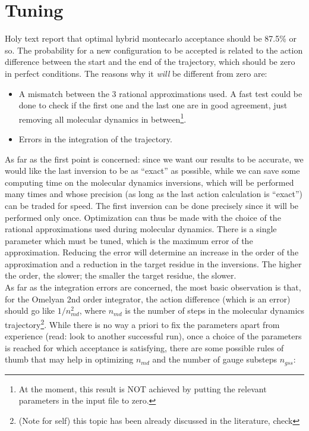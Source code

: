 \documentclass[a4paper,10pt]{book}
\begin{document}
\section{Tuning}
Holy text report that optimal hybrid montecarlo acceptance should be 87.5\% or so. 
The probability for a new configuration to be accepted is related to the action 
difference between the start and the end of the trajectory, which should be zero in 
perfect conditions. The reasons why it \emph{will} be different from zero are:
\begin{itemize}
 \item A mismatch between the 3 rational approximations used. A fast test could be done 
to check if the first one and the last one are in good agreement, just removing all 
molecular dynamics in between\footnote{At the moment, this result is NOT achieved by 
putting the relevant parameters in the input file to zero.}. 
 \item Errors in the integration of the trajectory.
\end{itemize}
As far as the first point is concerned: since we want our results to be accurate, we 
would like the last inversion to be as 
``exact'' as possible, while we can save some computing time on the molecular dynamics 
inversions, which will be performed many times and whose precision (as long as the last 
action calculation is ``exact'') can be traded for speed. The first inversion can be 
done precisely since it will be performed only once. Optimization can thus be made with
the choice of the rational approximations used during molecular dynamics. There is a 
single parameter which must be tuned, which is the maximum error of the approximation. 
Reducing the error will determine an increase in the order of the approximation and a 
reduction in the target residue in the inversions. The higher the order, the slower; 
the smaller the target residue, the slower. \\
As far as the integration errors are concerned, the most basic observation is that, for 
the Omelyan 2nd order integrator, the action difference (which is an error) should go 
like $1/n^2_{md}$, where $n_{md}$ is the number of steps in the molecular dynamics 
trajectory\footnote{(Note for self) this topic has been already discussed in the 
literature, check}. While there is no way a priori to fix the parameters apart from 
experience (read: look to another successful run), once a choice of the parameters is 
reached for which acceptance is satisfying, there are some possible rules of thumb that 
may help in optimizing $n_{md}$ and the number of gauge substeps $n_{gss}$:
\end{document}
